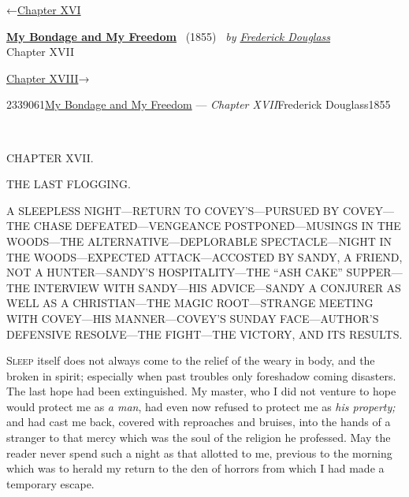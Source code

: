 \hypertarget{headerContainer}{}
\hypertarget{navigationHeader}{}
\protect\hypertarget{headerprevious}{}{←\href{/wiki/My_Bondage_and_My_Freedom_(1855)/Chapter_XVI}{Chapter
XVI}}

\textbf{\protect\hypertarget{header_title_text}{}{\href{/wiki/My_Bondage_and_My_Freedom_(1855)}{My
Bondage and My Freedom}}} ~(1855)~ \emph{by
\href{/wiki/Author:Frederick_Douglass}{\protect\hypertarget{header_author_text}{}{{Frederick
Douglass}}}}\\
\protect\hypertarget{header_section_text}{}{Chapter XVII}

\protect\hypertarget{headernext}{}{\href{/wiki/My_Bondage_and_My_Freedom_(1855)/Chapter_XVIII}{Chapter
XVIII}→}

\hypertarget{navigationNotes}{}

\hypertarget{ws-data}{}
\protect\hypertarget{ws-article-id}{}{2339061}\protect\hypertarget{ws-title}{}{\href{/wiki/My_Bondage_and_My_Freedom_(1855)}{My
Bondage and My Freedom} --- \emph{Chapter
XVII}}\protect\hypertarget{ws-author}{}{Frederick
Douglass}\protect\hypertarget{ws-year}{}{1855}

{\protect\hypertarget{233}{}{}}

~

{CHAPTER XVII.}

THE LAST FLOGGING.

{A SLEEPLESS NIGHT---RETURN TO COVEY'S---PURSUED BY COVEY---THE CHASE
DEFEATED---VENGEANCE POSTPONED---MUSINGS IN THE WOODS---THE
ALTERNATIVE---DEPLORABLE SPECTACLE---NIGHT IN THE WOODS---EXPECTED
ATTACK---ACCOSTED BY SANDY, A FRIEND, NOT A HUNTER---SANDY'S
HOSPITALITY---THE ``ASH CAKE'' SUPPER---THE INTERVIEW WITH SANDY---HIS
ADVICE---SANDY A CONJURER AS WELL AS A CHRISTIAN---THE MAGIC
ROOT---STRANGE MEETING WITH COVEY---HIS MANNER---COVEY'S SUNDAY
FACE---AUTHOR'S DEFENSIVE RESOLVE---THE FIGHT---THE VICTORY, AND ITS
RESULTS.}

\textsc{Sleep} itself does not always come to the relief of the weary in
body, and the broken in spirit; especially when past troubles only
foreshadow coming disasters. The last hope had been extinguished. My
master, who I did not venture to hope would protect me as \emph{a man},
had even now refused to protect me as \emph{his property;} and had cast
me back, covered with reproaches and bruises, into the hands of a
stranger to that mercy which was the soul of the religion he professed.
May the reader never spend such a night as that allotted to me, previous
to the morning which was to herald my return to the den of horrors from
which I had made a temporary escape.


